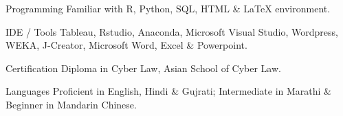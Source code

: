 


\begin{cvskills}


\cvskill
{Programming} %
{Familiar with R, Python, SQL, HTML \& LaTeX environment.} %


\cvskill
{IDE / Tools} %
{Tableau, Rstudio, Anaconda, Microsoft Visual Studio, Wordpress, WEKA, J-Creator, Microsoft Word, Excel \& Powerpoint.} %


\cvskill
{Certification} %
{Diploma in Cyber Law, Asian School of Cyber Law.} %


\cvskill
{Languages} %
{Proficient in English, Hindi \& Gujrati; Intermediate in Marathi \& Beginner in Mandarin Chinese.} %




\end{cvskills}
\vspace{-0.5\baselineskip} 